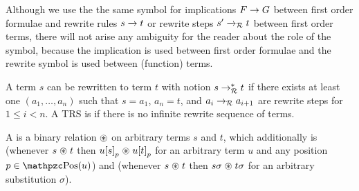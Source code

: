 Although we use the the same symbol for implications \( F\rightarrow G \) between first order formulae
and rewrite rules \( s\xrightarrow[{}]{} t \) or rewrite steps \( s'\xrightarrow[{}]{}_{\mathcal{R}} t \) between first order terms,
there will not arise any ambiguity for the reader about the role of the symbol,
because the implication is used between first order formulae
and the rewrite symbol is used between (function) terms.
%
%
\begin{definition}
	A term \( s \) can be rewritten to term \( t \) with notion \( s\rightarrow^*_{\mathcal{R}} t \)
	if there exists at least one  \( (a_1,\ldots ,a_n) \) such that
	\( s=a_1 \), \( a_n=t \), and \( a_i\rightarrow_{\mathcal{R}} a_{i+1} \) are rewrite steps for \( 1\leq i<n \).
	A TRS is  if there is no infinite rewrite sequence of terms.
\end{definition}
%
\begin{definition}\label{def:closed-under}
	A  is a binary relation
	\( \mathrel{\circledast} \) on arbitrary terms \( s \) and \( t \),
	which additionally is 
	(whenever \( s\mathrel{\circledast} t \) then \( u{[s]}_p\mathrel{\circledast} u{[t]}_p \)
	for an arbitrary term \( u \) and any position \( p\in\pos(u) \))
	and 
	(whenever \( s\mathrel{\circledast} t \) then \( s\sigma\mathrel{\circledast} t\sigma \)
	for an arbitrary substitution \( \sigma \)).
\end{definition}
